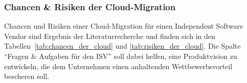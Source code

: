 \subsubsection{Chancen \& Risiken der Cloud-Migration}
\label{cha:chancen_und_risken}
Chancen und Risiken einer Cloud-Migration für einen Independent Software 
Vendor sind Ergebnis der Literaturrecherche und finden sich in den
Tabellen~\ref{tab:chancen_der_cloud} und \ref{tab:risiken_der_cloud}. Die 
Spalte "`Fragen \& Aufgaben für den ISV"' soll dabei helfen, eine 
Produktvision zu entwickeln, die dem Unternehmen einen anhaltenden 
Wettbewerbsvorteil bescheren soll.



